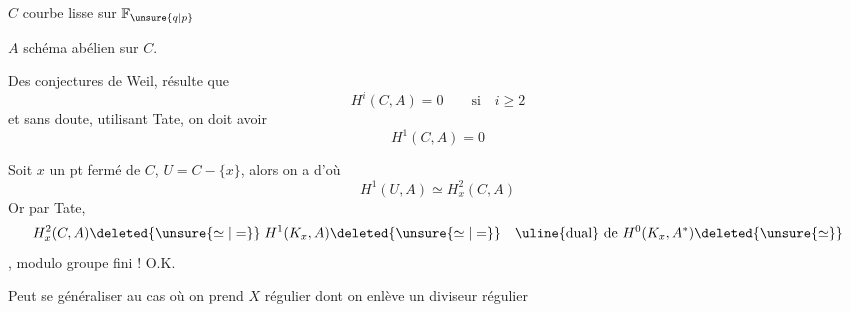 $C$ courbe lisse  sur $\mathbb{F}_{\unsure{q|p}}$

$A$ schéma abélien sur $C$.

Des conjectures de Weil, résulte que
\[
H^i(C,A)=0\qquad\text{si}\quad i\geq 2
\]
et sans doute, utilisant Tate, on doit avoir
\[
H^1(C,A)=0
\]

Soit $x$ un pt fermé de $C$, $U=C-\{x\}$, alors on a
d'où
\[
H^1(U,A)\simeq H^2_x(C,A)
\]
Or par Tate,
\[
H^2_x(C,A)\deleted{\unsure{\simeq|=}}\;H^1(K_x,A)\deleted{\unsure{\simeq|=}}\quad
\text{\uline{dual} de }H^0(K_x,A^{*})\deleted{\unsure{\simeq}}
\]
 , modulo groupe fini ! O.K.

Peut se généraliser au cas où on prend $X$ régulier dont on enlève un diviseur régulier \textendash\,\textendash\,\textendash\,\textendash
